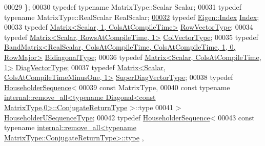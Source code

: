 \begin{DoxyCode}
00029     \};
00030     \textcolor{keyword}{typedef} \textcolor{keyword}{typename} MatrixType::Scalar Scalar;
00031     \textcolor{keyword}{typedef} \textcolor{keyword}{typename} MatrixType::RealScalar RealScalar;
\hyperlink{class_eigen_1_1internal_1_1_upper_bidiagonalization_adcb14f3919a3dcc9977ba6b8105087fe}{00032}     \textcolor{keyword}{typedef} \hyperlink{namespace_eigen_a62e77e0933482dafde8fe197d9a2cfde}{Eigen::Index} \hyperlink{class_eigen_1_1internal_1_1_upper_bidiagonalization_adcb14f3919a3dcc9977ba6b8105087fe}{Index}; 
00033     \textcolor{keyword}{typedef} \hyperlink{group___core___module_class_eigen_1_1_matrix}{Matrix<Scalar, 1, ColsAtCompileTime>} 
      \hyperlink{group___core___module_class_eigen_1_1_matrix}{RowVectorType};
00034     \textcolor{keyword}{typedef} \hyperlink{group___core___module_class_eigen_1_1_matrix}{Matrix<Scalar, RowsAtCompileTime, 1>} 
      \hyperlink{group___core___module_class_eigen_1_1_matrix}{ColVectorType};
00035     \textcolor{keyword}{typedef} 
      \hyperlink{group___core___module}{BandMatrix<RealScalar, ColsAtCompileTime, ColsAtCompileTime, 1, 0, RowMajor>}
       \hyperlink{group___core___module}{BidiagonalType};
00036     \textcolor{keyword}{typedef} \hyperlink{group___core___module_class_eigen_1_1_matrix}{Matrix<Scalar, ColsAtCompileTime, 1>} 
      \hyperlink{group___core___module_class_eigen_1_1_matrix}{DiagVectorType};
00037     \textcolor{keyword}{typedef} \hyperlink{group___core___module_class_eigen_1_1_matrix}{Matrix<Scalar, ColsAtCompileTimeMinusOne, 1>} 
      \hyperlink{group___core___module_class_eigen_1_1_matrix}{SuperDiagVectorType};
00038     \textcolor{keyword}{typedef} \hyperlink{group___householder___module_class_eigen_1_1_householder_sequence}{HouseholderSequence}<
00039               \textcolor{keyword}{const} MatrixType,
00040               \textcolor{keyword}{const} \textcolor{keyword}{typename} 
      \hyperlink{struct_eigen_1_1internal_1_1remove__all}{internal::remove\_all<typename Diagonal<const MatrixType,0>::ConjugateReturnType}
      >::type
00041             > \hyperlink{group___householder___module_class_eigen_1_1_householder_sequence}{HouseholderUSequenceType};
00042     \textcolor{keyword}{typedef} \hyperlink{group___householder___module_class_eigen_1_1_householder_sequence}{HouseholderSequence}<
00043               \textcolor{keyword}{const} \textcolor{keyword}{typename} 
      \hyperlink{group___sparse_core___module}{internal::remove\_all<typename MatrixType::ConjugateReturnType>::type}
      ,

\end{DoxyCode}
